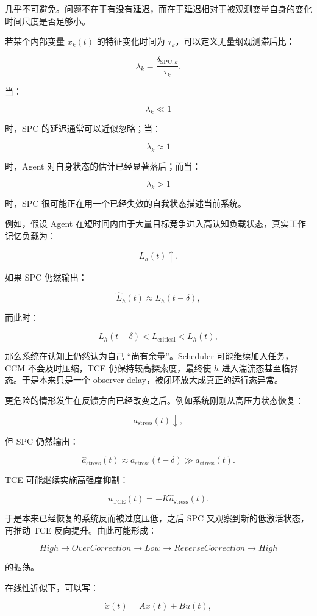 几乎不可避免。问题不在于有没有延迟，而在于延迟相对于被观测变量自身的变化时间尺度是否足够小。

若某个内部变量 $x_k(t)$ 的特征变化时间为 $\tau_k$，可以定义无量纲观测滞后比：

\[
\lambda_k
=
\frac{\delta_{\mathrm{SPC},k}}
{\tau_k}.
\]

当：

\[
\lambda_k\ll 1
\]

时，SPC 的延迟通常可以近似忽略；当：

\[
\lambda_k\approx 1
\]

时，Agent 对自身状态的估计已经显著落后；而当：

\[
\lambda_k>1
\]

时，SPC 很可能正在用一个已经失效的自我状态描述当前系统。

例如，假设 Agent 在短时间内由于大量目标竞争进入高认知负载状态，真实工作记忆负载为：

\[
L_h(t)\uparrow.
\]

如果 SPC 仍然输出：

\[
\hat{L}_h(t)\approx L_h(t-\delta),
\]

而此时：

\[
L_h(t-\delta)
<
L_{\mathrm{critical}}
<
L_h(t),
\]

那么系统在认知上仍然认为自己 ``尚有余量''。Scheduler 可能继续加入任务，CCM 不会及时压缩，TCE 仍保持较高探索度，最终使 $h$ 进入湍流态甚至临界态。于是本来只是一个 observer delay，被闭环放大成真正的运行态异常。

更危险的情形发生在反馈方向已经改变之后。例如系统刚刚从高压力状态恢复：

\[
a_{\mathrm{stress}}(t)\downarrow,
\]

但 SPC 仍然输出：

\[
\hat{a}_{\mathrm{stress}}(t)
\approx
a_{\mathrm{stress}}(t-\delta)
\gg
a_{\mathrm{stress}}(t).
\]

TCE 可能继续实施高强度抑制：

\[
u_{\mathrm{TCE}}(t)
=
-K
\hat{a}_{\mathrm{stress}}(t).
\]

于是本来已经恢复的系统反而被过度压低，之后 SPC 又观察到新的低激活状态，再推动 TCE 反向提升。由此可能形成：

\[
High
\rightarrow
OverCorrection
\rightarrow
Low
\rightarrow
ReverseCorrection
\rightarrow
High
\]

的振荡。

在线性近似下，可以写：

\[
\dot{x}(t)
=
Ax(t)
+
Bu(t),
\]

